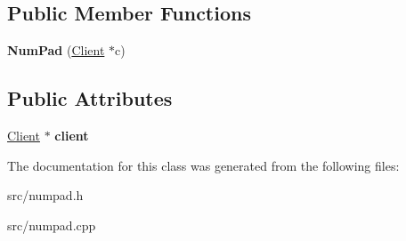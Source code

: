 \subsection*{Public Member Functions}
\begin{DoxyCompactItemize}
\item 
\hypertarget{class_num_pad_ac35bfd6bb99a182c9073d80a09f3baf9}{}\label{class_num_pad_ac35bfd6bb99a182c9073d80a09f3baf9} 
{\bfseries Num\+Pad} (\hyperlink{class_client}{Client} $\ast$c)
\end{DoxyCompactItemize}
\subsection*{Public Attributes}
\begin{DoxyCompactItemize}
\item 
\hypertarget{class_num_pad_aeba02dbc3ca834bbd75f817855f5ecfb}{}\label{class_num_pad_aeba02dbc3ca834bbd75f817855f5ecfb} 
\hyperlink{class_client}{Client} $\ast$ {\bfseries client}
\end{DoxyCompactItemize}


The documentation for this class was generated from the following files\+:\begin{DoxyCompactItemize}
\item 
src/numpad.\+h\item 
src/numpad.\+cpp\end{DoxyCompactItemize}
